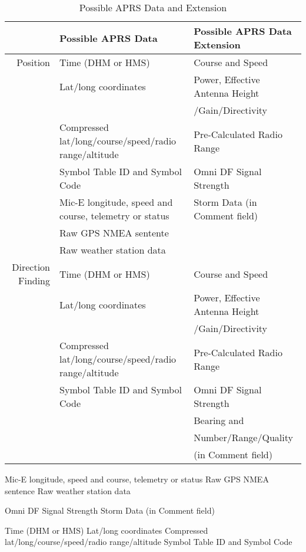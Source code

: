 \begin{table}[htbp]
  \caption{Possible APRS Data and Extension}
  \begin{tabular}{|r|l|l|}
    \hline
    & Possible APRS Data & Possible APRS Data Extension \\
    \hline
    Position & Time (DHM or HMS) & Course and Speed \\
    & Lat/long coordinates & Power, Effective Antenna Height \\
    & & /Gain/Directivity \\
    & Compressed lat/long/course/speed/radio range/altitude & Pre-Calculated Radio Range \\
    & Symbol Table ID and Symbol Code & Omni DF Signal Strength \\
    & Mic-E longitude, speed and course, telemetry or status & Storm Data (in Comment field) \\
    & Raw GPS NMEA sentente & \\
    & Raw weather station data & \\
    \hline
    Direction Finding & Time (DHM or HMS) & Course and Speed \\
    & Lat/long coordinates & Power, Effective Antenna Height \\
    & & /Gain/Directivity \\
    & Compressed lat/long/course/speed/radio range/altitude & Pre-Calculated Radio Range \\
    & Symbol Table ID and Symbol Code & Omni DF Signal Strength \\
    & & Bearing and \\
    & & Number/Range/Quality \\
    & & (in Comment field) \\
    \hline
    
    
    \hline
  \end{tabular}
\end{table}


\clearpage

  




Mic-E longitude, speed and course, telemetry or status
Raw GPS NMEA sentence
Raw weather station data




Omni DF Signal Strength
Storm Data (in Comment field)

Time (DHM or HMS)
Lat/long coordinates
Compressed lat/long/course/speed/radio range/altitude
Symbol Table ID and Symbol Code

